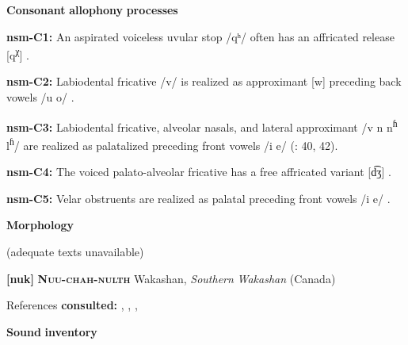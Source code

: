 \begin{styleBody}
\textbf{Consonant} \textbf{allophony} \textbf{processes}
\end{styleBody}

\begin{styleBody}
\textbf{nsm-C1:} An aspirated voiceless uvular stop /qʰ/ often has an affricated release [q\textsuperscript{χ}] \citep[39]{Teo2009}.
\end{styleBody}

\begin{styleBody}
\textbf{nsm-C2:} Labiodental fricative /v/ is realized as approximant [w] preceding back vowels /u o/ \citep[39]{Teo2009}.
\end{styleBody}

\begin{styleBody}
\textbf{nsm-C3:} Labiodental fricative, alveolar nasals, and lateral approximant /v n n\textsuperscript{ɦ} l\textsuperscript{ɦ}/ are realized as palatalized preceding front vowels /i e/ (\citealt{Teo2009}: 40, 42).
\end{styleBody}

\begin{styleBody}
\textbf{nsm-C4:} The voiced palato-alveolar fricative has a free affricated variant [d͡ʒ] \citep[40]{Teo2009}.
\end{styleBody}

\begin{styleBody}
\textbf{nsm-C5:} Velar obstruents are realized as palatal preceding front vowels /i e/ \citep[368]{Teo2012}.
\end{styleBody}

\begin{styleBody}
\textbf{Morphology}
\end{styleBody}

\begin{styleBody}
(adequate texts unavailable)
\end{styleBody}

\begin{styleBody}
\textbf{[nuk]}   \textbf{\textsc{Nuu-chah-nulth}}  Wakashan, \textit{Southern} \textit{Wakashan} (Canada)
\end{styleBody}

\begin{styleBody}
References \textbf{consulted:} \citet{CarlsonEtAl2001}, \citet{Kim2003}, \citet{Rose1981}, \citet{Stonham1999}
\end{styleBody}

\begin{styleBody}
\textbf{Sound} \textbf{inventory}
\end{styleBody}

